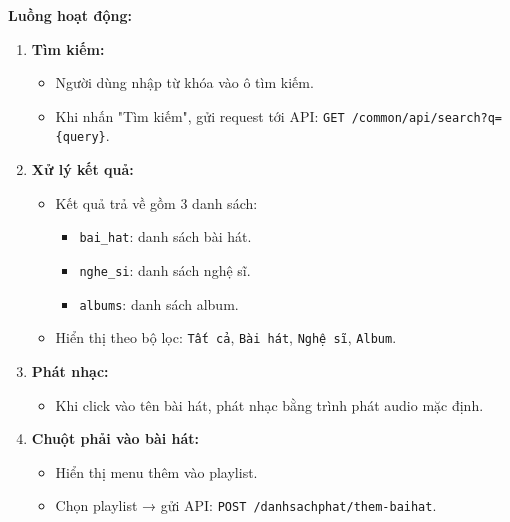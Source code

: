 \textbf{Luồng hoạt động:}
\begin{enumerate}
  \item \textbf{Tìm kiếm:}
  \begin{itemize}
    \item Người dùng nhập từ khóa vào ô tìm kiếm.
    \item Khi nhấn "Tìm kiếm", gửi request tới API:
    \texttt{GET /common/api/search?q=\{query\}}.
  \end{itemize}

  \item \textbf{Xử lý kết quả:}
  \begin{itemize}
    \item Kết quả trả về gồm 3 danh sách:
    \begin{itemize}
      \item \texttt{bai\_hat}: danh sách bài hát.
      \item \texttt{nghe\_si}: danh sách nghệ sĩ.
      \item \texttt{albums}: danh sách album.
    \end{itemize}
    \item Hiển thị theo bộ lọc:
    \texttt{Tất cả}, \texttt{Bài hát}, \texttt{Nghệ sĩ}, \texttt{Album}.
  \end{itemize}

  \item \textbf{Phát nhạc:}
  \begin{itemize}
    \item Khi click vào tên bài hát, phát nhạc bằng trình phát audio mặc định.
  \end{itemize}

  \item \textbf{Chuột phải vào bài hát:}
  \begin{itemize}
    \item Hiển thị menu thêm vào playlist.
    \item Chọn playlist → gửi API:
    \texttt{POST /danhsachphat/them-baihat}.
  \end{itemize}


\end{enumerate}
